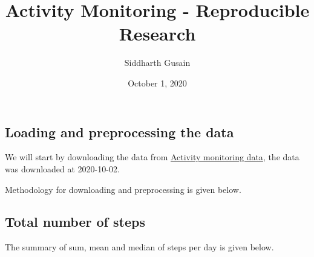 \documentclass[]{article}
\title{Activity Monitoring - Reproducible Research}
\author{Siddharth Gusain}
\date{October 1, 2020}
\newenvironment{Shaded}{\begin{snugshade}}{\end{snugshade}}
\newcommand{\KeywordTok}[1]{\textcolor[rgb]{0.13,0.29,0.53}{\textbf{#1}}}
\newcommand{\DataTypeTok}[1]{\textcolor[rgb]{0.13,0.29,0.53}{#1}}
\newcommand{\StringTok}[1]{\textcolor[rgb]{0.31,0.60,0.02}{#1}}
\newcommand{\OtherTok}[1]{\textcolor[rgb]{0.56,0.35,0.01}{#1}}
\newcommand{\OperatorTok}[1]{\textcolor[rgb]{0.81,0.36,0.00}{\textbf{#1}}}
\newcommand{\NormalTok}[1]{#1}
\begin{document}
\maketitle

\subsection{Loading and preprocessing the
data}\label{loading-and-preprocessing-the-data}

We will start by downloading the data from
\href{https://d396qusza40orc.cloudfront.net/repdata\%2Fdata\%2Factivity.zip}{Activity
monitoring data}, the data was downloaded at 2020-10-02.

Methodology for downloading and preprocessing is given below.

\begin{Shaded}
\end{Shaded}

\subsection{Total number of steps}\label{total-number-of-steps}

The summary of sum, mean and median of steps per day is given below.

\begin{Shaded}
\end{Shaded}
\end{document}
